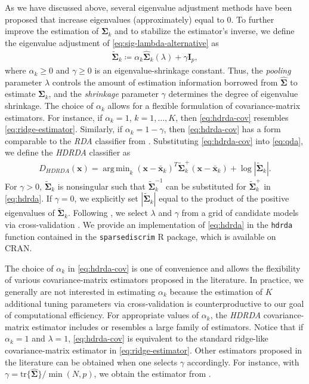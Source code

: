 \documentclass[]{interact}\usepackage[]{graphicx}\usepackage[]{color}
\newcommand{\xbar}{\bar{\bm x}}
\newcommand{\tr}{\text{tr}}
\DeclareMathOperator*{\argmin}{arg\,min}
\begin{document}
As we have discussed above, several eigenvalue adjustment methods have been
proposed that increase eigenvalues (approximately) equal to 0. To further
improve the estimation of $\bm \Sigma_k$ and to stabilize the estimator's
inverse, we define the eigenvalue adjustment of
\eqref{eq:sig-lambda-alternative} as
\begin{align}
	\tilde{\bm \Sigma}_k \coloneqq \alpha_k \widehat{\bm \Sigma}_k(\lambda) + \gamma \bm I_p,\label{eq:hdrda-cov}
\end{align}
where $\alpha_k \ge 0$ and $\gamma \ge 0$ is an eigenvalue-shrinkage
constant. Thus, the \emph{pooling} parameter $\lambda$ controls the amount of
estimation information borrowed from $\widehat{\bm \Sigma}$ to estimate $\bm
\Sigma_k$, and the \emph{shrinkage} parameter $\gamma$ determines the degree of
eigenvalue shrinkage. The choice of $\alpha_k$ allows for a flexible formulation
of covariance-matrix estimators. For instance, if $\alpha_k = 1$, $k = 1,
\ldots, K$, then \eqref{eq:hdrda-cov} resembles \eqref{eq:ridge-estimator}.
Similarly, if $\alpha_k = 1 - \gamma$, then \eqref{eq:hdrda-cov} has a form
comparable to the \emph{RDA} classifier from \cite{Friedman:1989tm}.
Substituting \eqref{eq:hdrda-cov} into \eqref{eq:qda}, we define the
\emph{HDRDA} classifier as
\begin{align}
	D_{HDRDA}(\bm x) = \argmin_{k}  (\bm x - \xbar_k)^{T}\tilde{\bm \Sigma}_k^{+}(\bm x - \xbar_k)  + \log |\tilde{\bm \Sigma}_k|. \label{eq:hdrda}
\end{align}
For $\gamma > 0$, $\tilde{\bm \Sigma}_k$ is nonsingular such that $\tilde{\bm
  \Sigma}_k^{-1}$ can be substituted for $\tilde{\bm \Sigma}_k^{+}$ in
\eqref{eq:hdrda}. If $\gamma = 0$, we explicitly set $|\tilde{\bm \Sigma}_k|$
equal to the product of the positive eigenvalues of $\tilde{\bm
  \Sigma}_k$. Following \cite{Friedman:1989tm}, we select $\lambda$ and $\gamma$
from a grid of candidate models via cross-validation \citep{Hastie:2008dt}. We provide an
implementation of \eqref{eq:hdrda} in the {\tt hdrda} function contained in the
{\tt sparsediscrim} R package, which is available on CRAN.

The choice of $\alpha_k$ in \eqref{eq:hdrda-cov} is one of convenience and
allows the flexibility of various covariance-matrix estimators proposed in the
literature. In practice, we generally are not interested in estimating
$\alpha_k$ because the estimation of $K$ additional tuning parameters via
cross-validation is counterproductive to our goal of computational efficiency.
For appropriate values of $\alpha_k$, the \emph{HDRDA} covariance-matrix
estimator includes or resembles a large family of estimators. Notice that if
$\alpha_k = 1$ and $\lambda = 1$, \eqref{eq:hdrda-cov} is equivalent to the
standard ridge-like covariance-matrix estimator in \eqref{eq:ridge-estimator}.
Other estimators proposed in the literature can be obtained when one selects
$\gamma$ accordingly. For instance, with $\gamma = \tr\{ \widehat{\bm \Sigma} \}
/ \min(N, p)$, we obtain the estimator from \cite{Srivastava:2007ww}.
\end{document}
